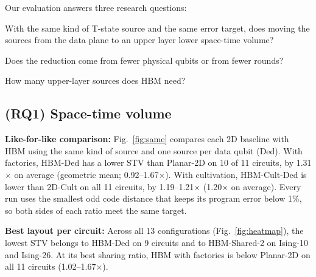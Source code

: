 %


Our evaluation answers three research questions:
\begin{description}[leftmargin=2.6em, labelwidth=2.2em, font=\normalfont\bfseries]
  \item[RQ1:] With the same kind of T-state source and the same error target, does moving
    the sources from the data plane to an upper layer lower space-time volume?
  \item[RQ2:] Does the reduction come from fewer physical qubits or from fewer rounds?
  \item[RQ3:] How many upper-layer sources does HBM need?
\end{description}


\subsection{(RQ1) Space-time volume}

\textbf{Like-for-like comparison:} Fig.~\ref{fig:same} compares each 2D baseline with HBM
using the same kind of source and one source per data qubit (Ded). With factories, HBM-Ded
has a lower STV than Planar-2D on 10 of 11 circuits, by 1.31$\times$ on average (geometric
mean; 0.92--1.67$\times$). With cultivation, HBM-Cult-Ded is lower than 2D-Cult on all 11
circuits, by 1.19--1.21$\times$ (1.20$\times$ on average). Every run uses the smallest odd
code distance that keeps its program error below 1\%, so both sides of each ratio meet the
same target.

\textbf{Best layout per circuit:} Across all 13 configurations (Fig.~\ref{fig:heatmap}), the
lowest STV belongs to HBM-Ded on 9 circuits and to HBM-Shared-2 on Ising-10 and Ising-26.
At its best sharing ratio, HBM with factories is below Planar-2D on all 11 circuits
(1.02--1.67$\times$).

